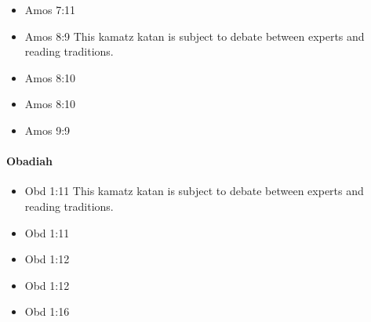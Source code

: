 \documentclass[14pt]{article}
\begin{document}
\begin{multicols}{2}
\begin{itemize}
																\item Amos 7:11
																
																\item Amos 8:9 This kamatz katan is subject to debate between experts and reading traditions.
																
																\item Amos 8:10
																
																\item Amos 8:10
																
																\item Amos 9:9
																
																								\end{itemize}\end{multicols}
															\paragraph{Obadiah}
														\begin{multicols}{2}\begin{itemize}
																
																\item Obd 1:11 This kamatz katan is subject to debate between experts and reading traditions.
																
																\item Obd 1:11
																
																\item Obd 1:12
																
																\item Obd 1:12
																
																\item Obd 1:16
																
																								\end{itemize}\end{multicols}
\end{document}
